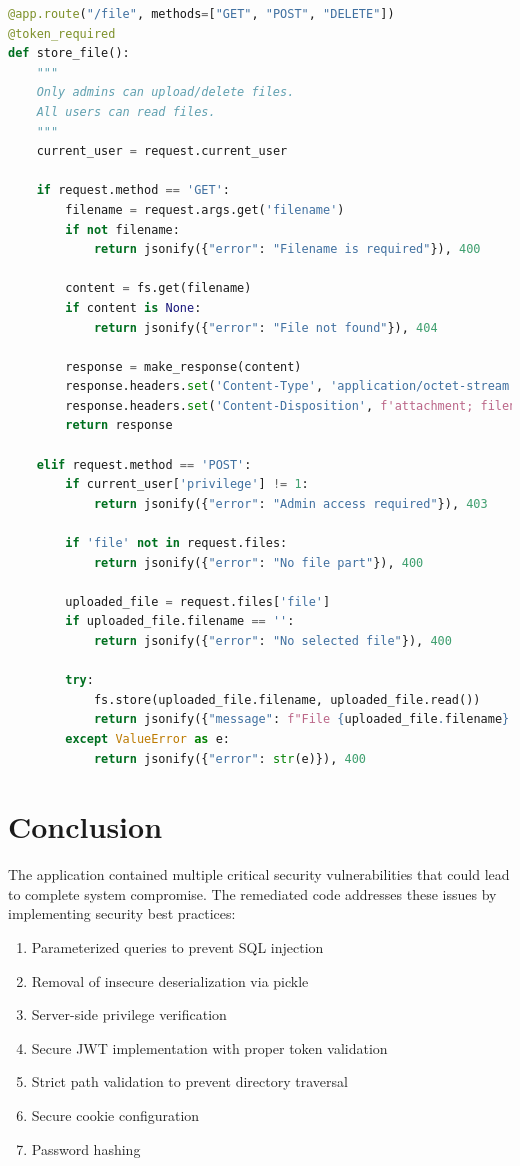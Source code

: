 \documentclass[11pt,a4paper]{article}
\begin{document}
\begin{lstlisting}[language=Python]
@app.route("/file", methods=["GET", "POST", "DELETE"])
@token_required
def store_file():
    """
    Only admins can upload/delete files.
    All users can read files.
    """
    current_user = request.current_user
    
    if request.method == 'GET':
        filename = request.args.get('filename')
        if not filename:
            return jsonify({"error": "Filename is required"}), 400
            
        content = fs.get(filename)
        if content is None:
            return jsonify({"error": "File not found"}), 404
            
        response = make_response(content)
        response.headers.set('Content-Type', 'application/octet-stream')
        response.headers.set('Content-Disposition', f'attachment; filename={os.path.basename(filename)}')
        return response
        
    elif request.method == 'POST':
        if current_user['privilege'] != 1:
            return jsonify({"error": "Admin access required"}), 403
            
        if 'file' not in request.files:
            return jsonify({"error": "No file part"}), 400
            
        uploaded_file = request.files['file']
        if uploaded_file.filename == '':
            return jsonify({"error": "No selected file"}), 400
            
        try:
            fs.store(uploaded_file.filename, uploaded_file.read())
            return jsonify({"message": f"File {uploaded_file.filename} uploaded successfully"})
        except ValueError as e:
            return jsonify({"error": str(e)}), 400
\end{lstlisting}

\section{Conclusion}

The application contained multiple critical security vulnerabilities that could lead to complete system compromise. The remediated code addresses these issues by implementing security best practices:

\begin{enumerate}
    \item Parameterized queries to prevent SQL injection
    \item Removal of insecure deserialization via pickle
    \item Server-side privilege verification
    \item Secure JWT implementation with proper token validation
    \item Strict path validation to prevent directory traversal
    \item Secure cookie configuration
    \item Password hashing
\end{enumerate}
\end{document}

